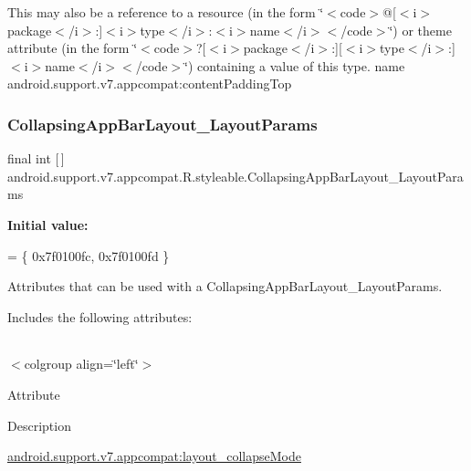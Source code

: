 This may also be a reference to a resource (in the form \char`\"{}$<$code$>$@\mbox{[}$<$i$>$package$<$/i$>$\+:\mbox{]}$<$i$>$type$<$/i$>$\+:$<$i$>$name$<$/i$>$$<$/code$>$\char`\"{}) or theme attribute (in the form \char`\"{}$<$code$>$?\mbox{[}$<$i$>$package$<$/i$>$\+:\mbox{]}\mbox{[}$<$i$>$type$<$/i$>$\+:\mbox{]}$<$i$>$name$<$/i$>$$<$/code$>$\char`\"{}) containing a value of this type.  name android.\+support.\+v7.\+appcompat\+:content\+Padding\+Top \mbox{\label{classandroid_1_1support_1_1v7_1_1appcompat_1_1R_1_1styleable_a12010970910a1c80a9bf9f6983f00001}} 
\subsubsection{\texorpdfstring{Collapsing\+App\+Bar\+Layout\+\_\+\+Layout\+Params}{CollapsingAppBarLayout\_LayoutParams}}
{\footnotesize\ttfamily final int \mbox{[}$\,$\mbox{]} android.\+support.\+v7.\+appcompat.\+R.\+styleable.\+Collapsing\+App\+Bar\+Layout\+\_\+\+Layout\+Params\hspace{0.3cm}{\ttfamily [static]}}

{\bfseries Initial value\+:}
\begin{DoxyCode}
= \{
            0x7f0100fc, 0x7f0100fd
        \}
\end{DoxyCode}
Attributes that can be used with a Collapsing\+App\+Bar\+Layout\+\_\+\+Layout\+Params. 

Includes the following attributes\+:

\tabulinesep=1mm
\begin{longtabu} spread 0pt [c]{*{0}{|X[-1]}|}
\hline
\end{longtabu}
$<$colgroup align=\char`\"{}left\char`\"{}$>$ 

Attribute

Description 

{\ttfamily \hyperlink{classandroid_1_1support_1_1v7_1_1appcompat_1_1R_1_1styleable_ab64b1431cc65e19392ff67fdd7a12d3c}{android.\+support.\+v7.\+appcompat\+:layout\+\_\+collapse\+Mode}}

